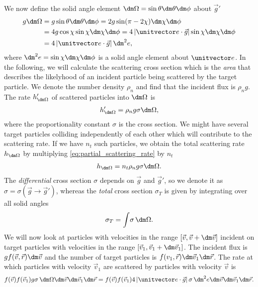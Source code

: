 We now define the solid angle element $\dm\Omega=\sin\theta \dm\theta \dm\phi$ about $\vec g'$ 
\begin{align}
	g \dm\Omega &= g\sin\theta \dm\theta \dm\phi = 2g\sin(\pi - 2\chi)\dm\chi \dm\phi\\
	&= 4g\cos\chi\sin\chi \dm\chi \dm\phi = 4\left|\unitvector e\cdot\vec g\right|\sin\chi \dm\chi \dm\phi\\
	&= 4\left|\unitvector e\cdot\vec g\right|\dm^2e,
\end{align}
where $\dm^2e = \sin\chi \dm\chi \dm\phi$ is a solid angle element about $\unitvector e$. In the following, we will calculate the scattering cross section which is the \textit{area} that describes the likelyhood of an incident particle being scattered by the target particle. We denote the number density $\rho_n$ and find that the incident flux is $\rho_n g$. The rate $h_{\dm\Omega}'$ of scattered particles into $\dm\Omega$ is
\begin{align}
	\label{eq:partial_scattering_rate}
	h_{\dm\Omega}' = \rho_n g\sigma \dm\Omega,
\end{align}
where the proportionality constant $\sigma$ is the cross section. We might have several target particles colliding independently of each other which will contribute to the scattering rate. If we have $n_t$ such particles, we obtain the total scattering rate $h_{\dm\Omega}$ by multiplying \eqref{eq:partial_scattering_rate} by $n_t$
\begin{align}
	h_{\dm\Omega} = n_t\rho_n g\sigma \dm\Omega.
\end{align}
The \textit{differential} cross section $\sigma$ depends on $\vec g$ and $\vec g'$, so we denote it as $\sigma = \sigma(\vec g\rightarrow \vec g')$, whereas the \textit{total} cross section $\sigma_T$ is given by integrating over all solid angles
\begin{align}
	\sigma_T = \int\! \sigma \, \dm\Omega.
\end{align}
We will now look at particles with velocities in the range $[\vec v, \vec v + \dm\vec v]$ incident on target particles with velocities in the range $[\vec v_1, \vec v_1 + \dm\vec v_1]$. The incident flux is $gf(\vec v,\vec r)\dm\vec v$ and the number of target particles is $f(v_1,\vec r)\dm\vec v_1\dm\vec r$. The rate at which particles with velocity $\vec v_1$ are scattered by particles with velocity $\vec v$ is 
\begin{align}
	f(\vec v)f(\vec v_1) g \sigma \, \dm\Omega \dm\vec v \dm\vec v_1 \dm\vec r = f(\vec v)f(\vec v_1)4\left|\unitvector e\cdot \vec g\right| \sigma \,\dm^2e \dm \vec v \dm\vec v_1 \dm \vec r.
\end{align}
